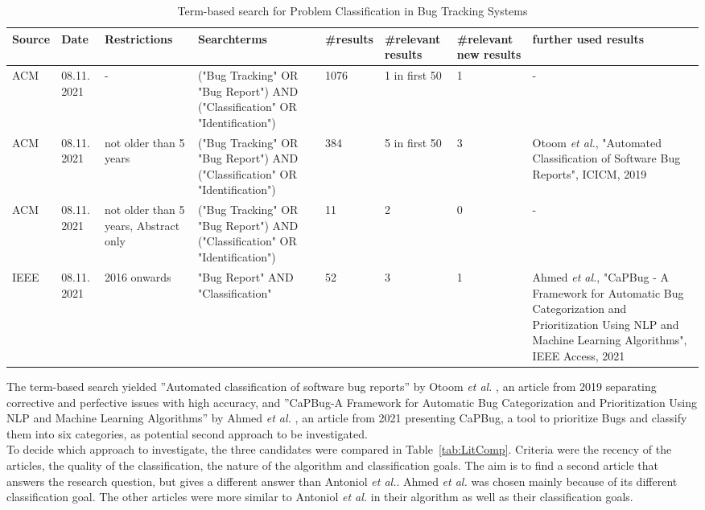 \begin{table} [h] 
\centering
\begin{footnotesize}
\setlength{\tabcolsep}{0.3em}
\renewcommand{\arraystretch}{1.5}
\caption{Term-based search for Problem Classification in Bug Tracking Systems}
\label{tab:LitSearch}
\begin{tabular}{l| p{0.7cm}|p{1.8cm}|p{2.2cm}|p{1.2cm}|p{1.5cm}|p{1.5cm}|p{3cm}}
\hline
\textbf{Source} & \textbf{Date} & \textbf{Restrictions} & \textbf{Searchterms} & \textbf{\#results} & \textbf{\#relevant results} & \textbf{\#relevant new \mbox{results}} & \textbf{further used \mbox{results}} \\ [0.5ex] 
\hline	
\hline	
  ACM & 08.11. 2021 & - & ("Bug Tracking" OR "Bug Report") AND ("Classification" OR "Identification") & 1076 & 1 in first 50 & 1 & -\\[0.5ex]
\hline	
ACM & 08.11. 2021 & not older than 5 years & ("Bug Tracking" OR "Bug Report") AND ("Classification" OR "Identification") & 384 & 5 in first 50 & 3 & Otoom \textit{et al.}, "Automated Classification of Software Bug Reports", ICICM, 2019\\[0.5ex]
\hline	
ACM & 08.11. 2021 & not older than 5 years, Abstract only & ("Bug Tracking" OR "Bug Report") AND ("Classification" OR "Identification") & 11 & 2 & 0 & - \\
\hline	
IEEE & 08.11. 2021 & 2016 onwards &  "Bug Report" AND "Classification" & 52 & 3 & 1 & Ahmed \textit{et al.}, "CaPBug - A Framework for Automatic Bug Categorization and Prioritization Using NLP and Machine Learning Algorithms", IEEE Access, 2021\\
\hline
\end{tabular}
\end{footnotesize}
\end{table}

The term-based search yielded ''Automated classification of software bug reports'' by Otoom \textit{et al.} \cite{Otoom2019}, an article from 2019 separating corrective and perfective issues with high accuracy, and ''CaPBug-A Framework for Automatic Bug Categorization and Prioritization Using NLP and Machine Learning Algorithms'' by Ahmed \textit{et al.} \cite{Ahmed2021}, an article from 2021 presenting CaPBug, a tool to prioritize Bugs and classify them into six categories, as potential second approach to be investigated.\\
To decide which approach to investigate, the three candidates were compared in \mbox{Table \ref{tab:LitComp}}. Criteria were the recency of the articles, the quality of the classification, the nature of the algorithm and classification goals. The aim is to find a second article that answers the research question, but gives a different answer than Antoniol \textit{et al.}. Ahmed \textit{et al.} was chosen mainly because of its different classification goal. The other articles were more similar to Antoniol \textit{et al.} in their algorithm as well as their classification goals.

